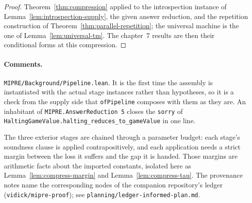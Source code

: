 \begin{proof}
\leanok
Theorem~\ref{thm:compression} applied to the introspection instance of
Lemma~\ref{lem:introspection-supply}, the given answer reduction, and the repetition
construction of Theorem~\ref{thm:parallel-repetition}; the universal machine is the one of
Lemma~\ref{lem:universal-tm}. The chapter~7 results are then their conditional forms at this
compression.
\end{proof}

\paragraph{Comments.} \texttt{MIPRE/Background/Pipeline.lean}. It is the first time the
assembly is instantiated with the actual stage instances rather than hypotheses, so it is a
check from the supply side that \texttt{ofPipeline} composes with them as they are. An
inhabitant of \texttt{MIPRE.AnswerReduction 5} closes the \texttt{sorry} of
\texttt{HaltingGameValue.halting\_reduces\_to\_gameValue} in one line.

The three exterior stages are chained through a parameter budget:
each stage's soundness clause is applied contrapositively, and each application needs a
strict margin between the loss it suffers and the gap it is handed. Those margins are
arithmetic facts about the imported constants, isolated here as
Lemma~\ref{lem:compress-margin} and Lemma~\ref{lem:compress-tau}. The provenance notes
name the corresponding nodes of the companion repository's ledger
(\texttt{vidick/mipre-proof}); see \texttt{planning/ledger-informed-plan.md}.

